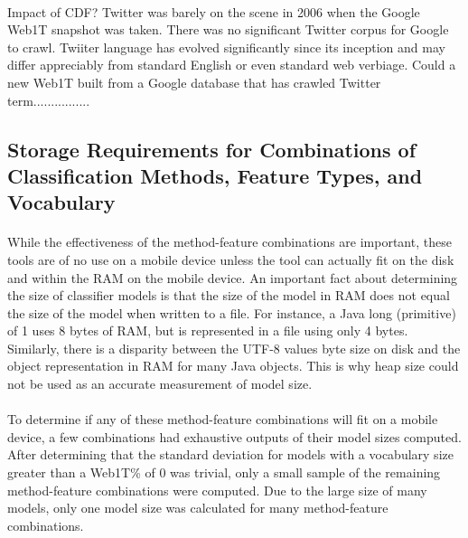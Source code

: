		\paragraph*{} Impact of CDF? Twitter was barely on the scene in 2006 when the Google Web1T snapshot was taken.  There was no significant Twitter corpus for Google to crawl.  Twiiter language has evolved significantly since its inception and may differ appreciably from standard English or even standard web verbiage.  Could a new Web1T built from a Google database that has crawled Twitter term................

\begin{singlespace}
\section{Storage Requirements for Combinations of Classification Methods, Feature Types, and Vocabulary}
\end{singlespace}
	\paragraph*{} While the effectiveness of the method-feature combinations are important, these tools are of no use on a mobile device unless the tool can actually fit on the disk and within the RAM on the mobile device.  An important fact about determining the size of classifier models is that the size of the model in RAM does not equal the size of the model when written to a file.  For instance, a Java long (primitive) of 1 uses 8 bytes of RAM, but is represented in a file using only 4 bytes.  Similarly, there is a disparity between the UTF-8 values byte size on disk and the object representation in RAM for many Java objects.  This is why heap size could not be used as an accurate measurement of model size.
	\paragraph*{}To determine if any of these method-feature combinations will fit on a mobile device, a few combinations had exhaustive outputs of their model sizes computed.  After determining that the standard deviation for models with a vocabulary size greater than a Web1T\% of 0 was trivial, only a small sample of the remaining method-feature combinations were computed.  Due to the large size of many models, only one model size was calculated for many method-feature combinations.  
